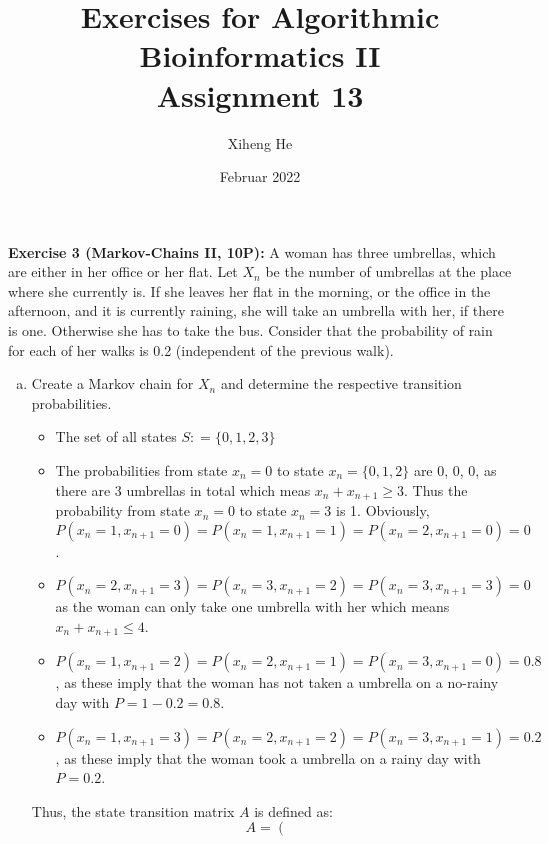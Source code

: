\documentclass[12pt]{article}
\title{Exercises for Algorithmic Bioinformatics II\\
Assignment 13}
\author{Xiheng He}
\date{Februar 2022}
\begin{document}
{\let\newpage\relax\maketitle}
\begin{flushleft}
\textbf{Exercise 3 (Markov-Chains II, 10P):}
\newline
A woman has three umbrellas, which are either in her office or her flat. Let $X_n$ be the number of
umbrellas at the place where she currently is. If she leaves her flat in the morning, or the office
in the afternoon, and it is currently raining, she will take an umbrella with her, if there is one.
Otherwise she has to take the bus. Consider that the probability of rain for each of her walks is 0.2
(independent of the previous walk).
\begin{enumerate}[(a)]
    \item Create a Markov chain for $X_n$ and determine the respective transition probabilities.
    \begin{itemize}
        \item The set of all states $S: = \{0, 1, 2, 3\}$
        \item The probabilities from state $x_n = 0$ to state $x_n = \{0, 1, 2\}$ are 0, 0, 0,
        as there are 3 umbrellas in total which meas $x_n + x_{n + 1} \geq 3$.
        Thus the probability from state $x_n = 0$ to state $x_n = 3$ is 1.
        Obviously, $P(x_n = 1, x_{n + 1} = 0) = P(x_n = 1, x_{n + 1} = 1) = P(x_n = 2, x_{n + 1} = 0) = 0$.
        \item $P(x_n = 2, x_{n + 1} = 3) = P(x_n = 3, x_{n + 1} = 2) = P(x_n = 3, x_{n + 1} = 3) = 0$ as
        the woman can only take one umbrella with her which means $x_n + x_{n + 1} \leq 4$.
        \item $P(x_n = 1, x_{n + 1} = 2) = P(x_n = 2, x_{n + 1} = 1) = P(x_n = 3, x_{n + 1} = 0) = 0.8$,
        as these imply that the woman has not taken a umbrella on a no-rainy day with $P = 1 - 0.2 = 0.8$.
        \item $P(x_n = 1, x_{n + 1} = 3) = P(x_n = 2, x_{n + 1} = 2) = P(x_n = 3, x_{n + 1} = 1) = 0.2$,
        as these imply that the woman took a umbrella on a rainy day with $P = 0.2$.
    \end{itemize}
    Thus, the state transition matrix $A$ is defined as: 
    \begin{equation*}
        A = 
        \left(\begin{array}{ccccc}

\end{array}
\end{equation*}
\end{enumerate}
\end{flushleft}
\end{document}
